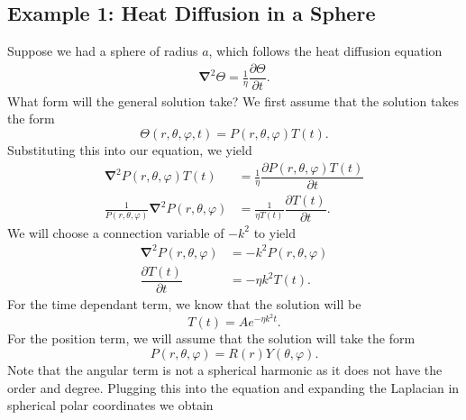 \documentclass[11pt]{report}
\newcommand{\fdel}[2]{\dfrac{\partial{#1}}{\partial {#2}}} %
\newcommand{\del}{\pmb{\nabla}}
\begin{document}
\subsection{Example 1: Heat Diffusion in a Sphere}
    Suppose we had a sphere of radius $a$, which follows the heat diffusion equation
        \begin{align*}
            \del^2\Theta = \frac{1}{\eta}\fdel{\Theta}{t}.
        \end{align*}
    What form will the general solution take?
    We first assume that the solution takes the form
        \[\Theta(r,\theta,\varphi,t) = P(r,\theta,\varphi)T(t).\]
    Substituting this into our equation, we yield
        \begin{align*}
            \del^2P(r,\theta,\varphi)T(t) &= \frac{1}{\eta}\fdel{P(r,\theta,\varphi)T(t)}{t}\\
            \frac{1}{P(r,\theta,\varphi)}\del^2P(r,\theta,\varphi) &= \frac{1}{\eta T(t)}\fdel{T(t)}{t}.
        \end{align*}
    We will choose a connection variable of $-k^2$ to yield
        \begin{align*}
             \del^2P(r,\theta,\varphi) &= -k^2P(r,\theta,\varphi)\\
             \fdel{T(t)}{t} &=-\eta  k^2T(t).
        \end{align*}
    For the time dependant term, we know that the solution will be
        \begin{equation*}
            T(t) = Ae^{-\eta k^2t}.
        \end{equation*}
    For the position term, we will assume that the solution will take the form
        \begin{equation*}
            P(r,\theta,\varphi) = R(r)Y(\theta,\varphi).
        \end{equation*}
    Note that the angular term is not a spherical harmonic as it does not have the order and degree. Plugging this into the equation and expanding the Laplacian in spherical polar coordinates we obtain
\end{document}
